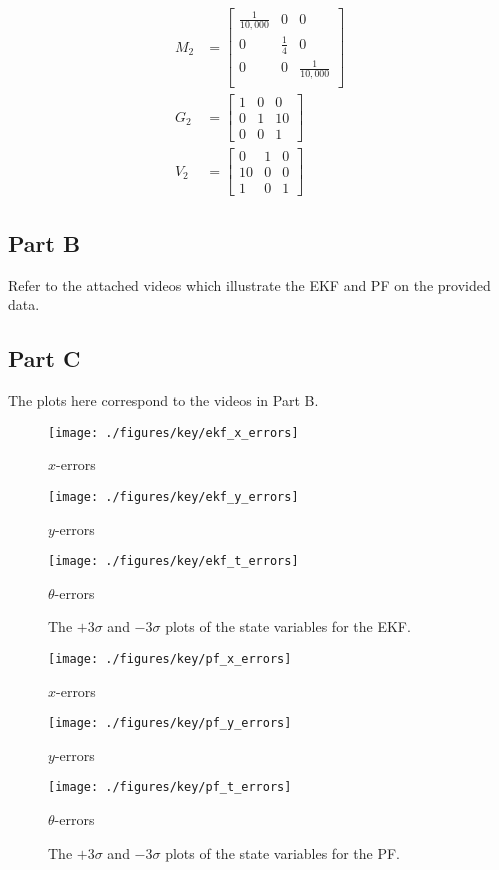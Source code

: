 \documentclass[11pt, oneside, letterpaper]{article}
\begin{document}
\begin{equation*}
\label{eqn:TimeStepTwo}
\begin{aligned}
M_2 &= \begin{bmatrix}
\frac{1}{10,000} & 0 & 0 \\
0 & \frac{1}{4} & 0 \\
0 & 0 & \frac{1}{10,000} \\
\end{bmatrix} \\
G_2 &= \begin{bmatrix}
1 & 0 & 0 \\
0 & 1 & 10 \\
0 & 0 & 1
\end{bmatrix} \\
V_2 &= \begin{bmatrix}
0 & 1 & 0 \\
10 & 0 & 0 \\
1 & 0 & 1
\end{bmatrix}
\end{aligned}
\end{equation*}

\subsection*{Part B}

Refer to the attached videos which illustrate the EKF and PF on the provided data.

\subsection*{Part C}

The plots here correspond to the videos in Part B.

\begin{figure}[!htb]
    \texttt{[image: ./figures/key/ekf\_x\_errors]}
    \caption*{$x$-errors}
\endminipage\hfill
{}
    \texttt{[image: ./figures/key/ekf\_y\_errors]}
    \caption*{$y$-errors}
\endminipage\hfill
{}%
    \texttt{[image: ./figures/key/ekf\_t\_errors]}
    \caption*{$\theta$-errors}
\endminipage
\caption{The $+3\sigma$ and $-3\sigma$ plots of the state variables for the EKF.}
\end{figure}

\begin{figure}[!htb]
    \texttt{[image: ./figures/key/pf\_x\_errors]}
    \caption*{$x$-errors}
\endminipage\hfill
{}
    \texttt{[image: ./figures/key/pf\_y\_errors]}
    \caption*{$y$-errors}
\endminipage\hfill
{}%
    \texttt{[image: ./figures/key/pf\_t\_errors]}
    \caption*{$\theta$-errors}
\endminipage
\caption{The $+3\sigma$ and $-3\sigma$ plots of the state variables for the PF.}
\end{figure}
\end{document}
